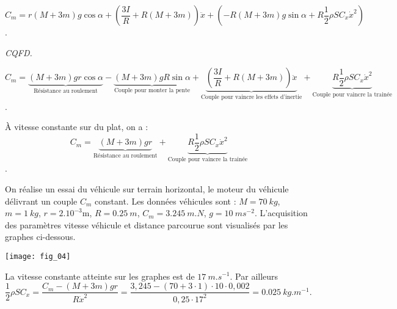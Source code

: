 \begin{multicols}{2}
\begin{corrige}
$C_m=r\left(M+3m\right)g \cos \alpha+\left(\dfrac{3I}{R}+R\left(M+3m\right)\right)\ddot{x} +\left(-R\left(M+3m\right)g\sin \alpha+ R\dfrac{1}{2}\rho S C_x \dot{x}^2\right)$. 

\begin{flushright}
\textit{CQFD.}
\end{flushright}

\end{corrige}
\else
\fi

\ifprof
\begin{corrige}

$$C_m=\underbrace{\left(M+3m\right)gr \cos \alpha}_{\text{Résistance au roulement}}-\underbrace{\left(M+3m\right)gR\sin \alpha}_{\text{Couple pour monter la pente}}+\underbrace{\left(\dfrac{3I}{R}+R\left(M+3m\right)\right)\ddot{x}}_{\text{Couple pour vaincre les effets d'inertie}} + \underbrace{R\dfrac{1}{2}\rho S C_x \dot{x}^2}_{\text{Couple pour vaincre la trainée}}$$. 

\end{corrige}
\else
\fi


\ifprof
\begin{corrige}
À vitesse constante sur du plat, on a :
$$C_m=\underbrace{\left(M+3m\right)gr}_{\text{Résistance au roulement}} + \underbrace{R\dfrac{1}{2}\rho S C_x \dot{x}^2}_{\text{Couple pour vaincre la trainée}}$$. 
\end{corrige}
\else
\fi

\ifprof
\else
On réalise un essai du véhicule sur terrain horizontal, le moteur du véhicule délivrant un couple $C_m$ constant.   
Les données véhicules sont :  $M = \SI{70}{kg}$, $m = \SI{1}{kg}$, $r = {2.10^{-3}}\text{m}$, $R = \SI{0,25}{m}$, $C_m= \SI{3,245}{m.N}$, $g = \SI{10}{ms^{-2}}$. L’acquisition des paramètres vitesse véhicule et distance parcourue sont visualisés par les graphes ci-dessous. 


\begin{center}
\texttt{[image: fig\_04]}
\end{center}
\fi

\ifprof
\begin{corrige}
La vitesse constante atteinte sur les graphes est de $\SI{17}{m.s^{-1}}$.  Par ailleurs 
$\dfrac{1}{2}\rho S C_x=\dfrac{C_m-\left(M+3m\right)gr}{R\dot{x}^2} =\dfrac{3,245-\left(70+3\cdot 1\right)\cdot 10 \cdot 0,002}{0,25\cdot 17^2}=\SI{0,025}{kg.m^{-1}}.$
\end{corrige}
\else
\fi



\end{multicols}
